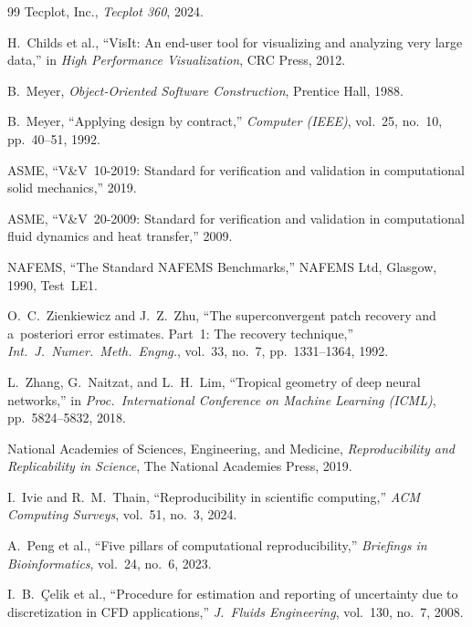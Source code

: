 \documentclass[journal]{IEEEtran}
\begin{document}
\begin{thebibliography}{99}
  Tecplot, Inc.,
  \emph{Tecplot 360}, 2024.

  H.~Childs et al.,
  ``VisIt: An end-user tool for visualizing and analyzing very large data,''
  in \emph{High Performance Visualization}, CRC Press, 2012.

  B.~Meyer,
  \emph{Object-Oriented Software Construction},
  Prentice Hall, 1988.

  B.~Meyer,
  ``Applying design by contract,''
  \emph{Computer (IEEE)}, vol.~25, no.~10, pp.~40--51, 1992.


  ASME,
  ``V\&V~10-2019: Standard for verification and validation in
  computational solid mechanics,'' 2019.

  ASME,
  ``V\&V~20-2009: Standard for verification and validation in computational
  fluid dynamics and heat transfer,'' 2009.

  NAFEMS,
  ``The Standard NAFEMS Benchmarks,''
  NAFEMS Ltd, Glasgow, 1990, Test~LE1.

  O.~C.~Zienkiewicz and J.~Z.~Zhu,
  ``The superconvergent patch recovery and a~posteriori error estimates.
  Part~1: The recovery technique,''
  \emph{Int.\ J.\ Numer.\ Meth.\ Engng.}, vol.~33, no.~7,
  pp.~1331--1364, 1992.

  L.~Zhang, G.~Naitzat, and L.~H.~Lim,
  ``Tropical geometry of deep neural networks,''
  in \emph{Proc.\ International Conference on Machine Learning (ICML)},
  pp.~5824--5832, 2018.

  National Academies of Sciences, Engineering, and Medicine,
  \emph{Reproducibility and Replicability in Science},
  The National Academies Press, 2019.

  I.~Ivie and R.~M.~Thain,
  ``Reproducibility in scientific computing,''
  \emph{ACM Computing Surveys}, vol.~51, no.~3, 2024.

  A.~Peng et al.,
  ``Five pillars of computational reproducibility,''
  \emph{Briefings in Bioinformatics}, vol.~24, no.~6, 2023.

  I.~B.~\c{C}elik et al.,
  ``Procedure for estimation and reporting of uncertainty due to
  discretization in CFD applications,''
  \emph{J.\ Fluids Engineering}, vol.~130, no.~7, 2008.


\end{thebibliography}
\end{document}
